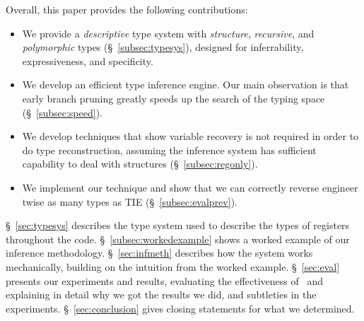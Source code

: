 Overall, this paper provides the following contributions:
\begin{itemize}
\item We provide a \emph{descriptive} type system with \emph{structure}, \emph {recursive}, and \emph{polymorphic} types (\S~\ref{subsec:typesys}), designed for inferrability, expressiveness, and specificity.
\item We develop an efficient type inference engine. Our main observation is that early branch pruning greatly speeds up the search of the typing space (\S~\ref{subsec:speed}).
\item We develop techniques that show variable recovery is not required in order to do type reconstruction, assuming the inference system has sufficient capability to deal with structures (\S~\ref{subsec:regonly}).
\item We implement our technique and show that we can correctly reverse engineer twise as many types as TIE (\S~\ref{subsec:evalprev}).
\end{itemize}

\S~\ref{sec:typesys} describes the type system used to describe the types of registers throughout the code. \S~\ref{subsec:workedexample} shows a worked example of our inference methodology. \S~\ref{sec:infmeth} describes how the system works mechanically, building on the intuition from the worked example. \S~\ref{sec:eval} presents our experiments and results, evaluating the effectiveness of \bitr\ and explaining in detail why we got the results we did, and subtleties in the experiments. \S~\ref{sec:conclusion} gives closing statements for what we determined.
